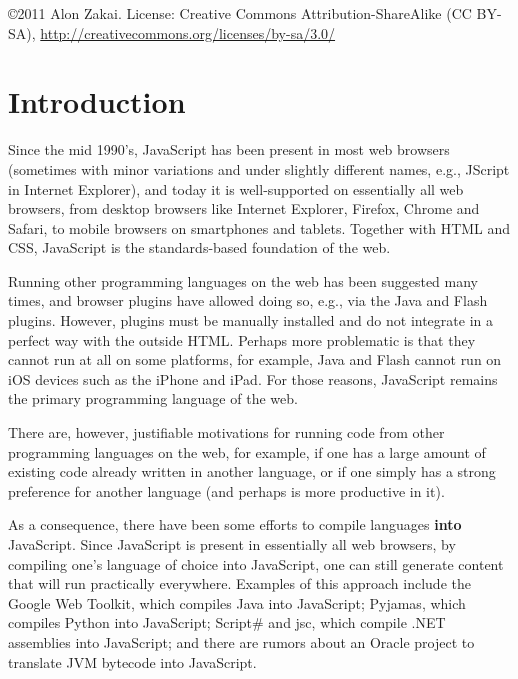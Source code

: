 \documentclass[11pt]{proc}
\begin{document}



\bigskip

\copyright 2011 Alon Zakai. License: Creative Commons Attribution-ShareAlike (CC BY-SA), \url{http://creativecommons.org/licenses/by-sa/3.0/}

\section{Introduction}

Since the mid 1990's, JavaScript has been present in most web browsers (sometimes
with minor variations and under slightly different names, e.g., JScript in Internet
Explorer), and today it is
well-supported on essentially all web browsers, from desktop browsers like
Internet Explorer, Firefox, Chrome and Safari, to mobile browsers on smartphones
and tablets. Together with HTML and CSS, JavaScript is the standards-based
foundation of the web.

Running other programming languages on the web has been suggested many times,
and browser plugins have allowed doing so, e.g., via the Java
and Flash plugins. However, plugins must be manually installed and do not integrate in
a perfect way with the outside HTML. Perhaps more problematic is that they cannot run
at all on some platforms, for example, Java and Flash cannot run on iOS devices such as the iPhone
and iPad. For those reasons, JavaScript remains
the primary programming language of the web.

There are, however, justifiable motivations for running code from
other programming languages on the web, for example, if one has a large
amount of existing code already written in another language, or if one
simply has a strong preference for another language (and perhaps is
more productive in it).

As a consequence, there have been some efforts to compile languages
\textbf{into} JavaScript. Since JavaScript is present in essentially all web
browsers, by compiling one's language of choice into JavaScript, one
can still generate content that will run practically everywhere.
Examples of this approach include the Google Web Toolkit, which compiles
Java into JavaScript; Pyjamas, which compiles Python into JavaScript;
Script\# and jsc, %
which compile .NET assemblies into JavaScript; and there are rumors
about an Oracle project to translate JVM bytecode into JavaScript.
\end{document}
